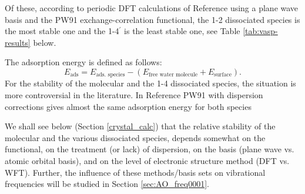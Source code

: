 \documentclass[11pt,DIV=13,BCOR=5mm,a4paper,headinclude]{scrbook}
\begin{document}
Of these, according to periodic DFT calculations of Reference\cite{WirthJPCC2012} using a plane wave basis and the PW91 exchange-correlation functional, the 1-2 dissociated species is the most stable one and the 1-4$^\prime$ is the least stable one, see Table \ref{tab:vasp-results} below.

The adsorption energy is defined as follows:
\begin{equation}\label{eq:Eads1}
  E_\textrm{ads}=E_\textrm{ads. species}-(E_\text{free water molecule}+E_\text{surface}).
\end{equation}
For the stability of the molecular and the 1-4 dissociated species, the situation is more controversial in the literature\cite{WirthJPCC2012,hass00,Ranea2009}.
In Reference\cite{WirthJPCC2012} PW91 with dispersion corrections gives almost the same adsorption energy for both species

We shall see below (Section \ref{crystal_calc}) that the relative stability of the molecular and the various dissociated species, depends somewhat on the functional, on the treatment (or lack) of dispersion, on the basis (plane wave vs. atomic orbital basis), and on the level of electronic structure method (DFT vs. WFT).
Further, the influence of these methods/basis sets on vibrational frequencies will be studied in Section \ref{sec:AO_freq0001}.
\end{document}
